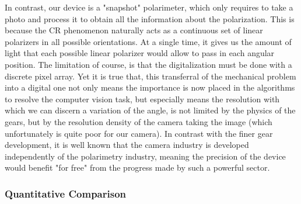 \documentclass[11pt, a4paper, twoside]{article} %
\begin{document}
In contrast, our device is a "snapshot" polarimeter, which only requires to take a photo and process it to obtain all the information about the polarization. This is because the CR phenomenon naturally acts as a continuous set of linear polarizers in all possible orientations. At a single time, it gives us the amount of light that each possible linear polarizer would allow to pass in each angular position. The limitation of course, is that the digitalization must be done with a discrete pixel array. Yet it is true that, this transferral of the mechanical problem into a digital one not only means the importance is now placed in the algorithms to resolve the computer vision task, but especially means the resolution with which we can discern a variation of the angle, is not limited by the physics of the gears, but by the resolution density of the camera taking the image (which unfortunately is quite poor for our camera). In contrast with the finer gear development, it is well known that the camera industry is developed independently of the polarimetry industry, meaning the precision of the device would benefit "for free" from the progress made by such a powerful sector.\vspace{-0.1cm}

\subsubsection*{Quantitative Comparison \vspace{-0.1cm}}
\end{document}
